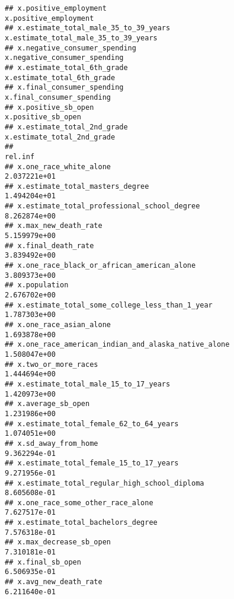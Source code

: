 \documentclass[
]{article}
\begin{document}
\begin{verbatim}
## x.positive_employment                                                                             x.positive_employment
## x.estimate_total_male_35_to_39_years                                               x.estimate_total_male_35_to_39_years
## x.negative_consumer_spending                                                               x.negative_consumer_spending
## x.estimate_total_6th_grade                                                                   x.estimate_total_6th_grade
## x.final_consumer_spending                                                                     x.final_consumer_spending
## x.positive_sb_open                                                                                   x.positive_sb_open
## x.estimate_total_2nd_grade                                                                   x.estimate_total_2nd_grade
##                                                                  rel.inf
## x.one_race_white_alone                                      2.037221e+01
## x.estimate_total_masters_degree                             1.494204e+01
## x.estimate_total_professional_school_degree                 8.262874e+00
## x.max_new_death_rate                                        5.159979e+00
## x.final_death_rate                                          3.839492e+00
## x.one_race_black_or_african_american_alone                  3.809373e+00
## x.population                                                2.676702e+00
## x.estimate_total_some_college_less_than_1_year              1.787303e+00
## x.one_race_asian_alone                                      1.693878e+00
## x.one_race_american_indian_and_alaska_native_alone          1.508047e+00
## x.two_or_more_races                                         1.444694e+00
## x.estimate_total_male_15_to_17_years                        1.420973e+00
## x.average_sb_open                                           1.231986e+00
## x.estimate_total_female_62_to_64_years                      1.074051e+00
## x.sd_away_from_home                                         9.362294e-01
## x.estimate_total_female_15_to_17_years                      9.271956e-01
## x.estimate_total_regular_high_school_diploma                8.605608e-01
## x.one_race_some_other_race_alone                            7.627517e-01
## x.estimate_total_bachelors_degree                           7.576318e-01
## x.max_decrease_sb_open                                      7.310181e-01
## x.final_sb_open                                             6.506935e-01
## x.avg_new_death_rate                                        6.211640e-01

\end{verbatim}
\end{document}
